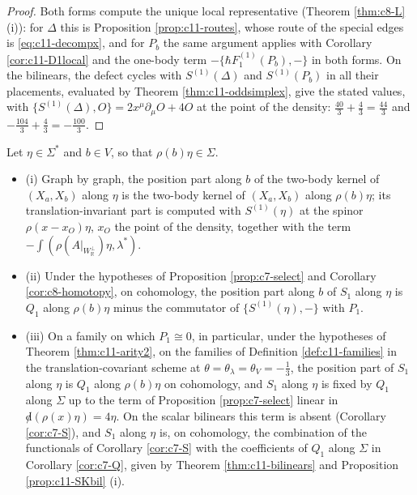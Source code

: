 \begin{proof}
Both forms compute the unique local representative (Theorem \ref{thm:c8-L} (i)): for $\Delta$ this is Proposition \ref{prop:c11-routes}, whose route of the special edges is \eqref{eq:c11-decompx}, and for $P_b$ the same argument applies with Corollary \ref{cor:c11-D1local} and the one-body term $-\{\hbar F_1^{(1)}(P_b),-\}$ in both forms. On the bilinears, the defect cycles with $S^{(1)}(\Delta)$ and $S^{(1)}(P_b)$ in all their placements, evaluated by Theorem \ref{thm:c11-oddsimplex}, give the stated values, with $\{S^{(1)}(\Delta),O\}=2x^\mu\partial_\mu O+4O$ at the point of the density: $\tfrac{40}3+\tfrac43=\tfrac{44}3$ and $-\tfrac{104}3+\tfrac43=-\tfrac{100}3$.
\end{proof}

\begin{proposition}
\label{prop:c11-S}
Let $\eta\in\Sigma^*$ and $b\in V$, so that $\rho(b)\eta\in\Sigma$.
\begin{itemize}
\item (i) Graph by graph, the position part along $b$ of the two-body kernel of $(X_a,X_b)$ along $\eta$ is the two-body kernel of $(X_a,X_b)$ along $\rho(b)\eta$; its translation-invariant part is computed with $S^{(1)}(\eta)$ at the spinor $\rho(x-x_O)\eta$, $x_O$ the point of the density, together with the term $-\int(\rho(A|_{W_{\mathbb R}^\perp})\eta,\lambda^*)$.
\item (ii) Under the hypotheses of Proposition \ref{prop:c7-select} and Corollary \ref{cor:c8-homotopy}, on cohomology, the position part along $b$ of $S_1$ along $\eta$ is $Q_1$ along $\rho(b)\eta$ minus the commutator of $\{S^{(1)}(\eta),-\}$ with $P_1$.
\item (iii) On a family on which $P_1\cong0$, in particular, under the hypotheses of Theorem \ref{thm:c11-arity2}, on the families of Definition \ref{def:c11-families} in the translation-covariant scheme at $\theta=\theta_\lambda=\theta_V=-\tfrac13$, the position part of $S_1$ along $\eta$ is $Q_1$ along $\rho(b)\eta$ on cohomology, and $S_1$ along $\eta$ is fixed by $Q_1$ along $\Sigma$ up to the term of Proposition \ref{prop:c7-select} linear in ${\not d}(\rho(x)\eta)=4\eta$. On the scalar bilinears this term is absent (Corollary \ref{cor:c7-S}), and $S_1$ along $\eta$ is, on cohomology, the combination of the functionals of Corollary \ref{cor:c7-S} with the coefficients of $Q_1$ along $\Sigma$ in Corollary \ref{cor:c7-Q}, given by Theorem \ref{thm:c11-bilinears} and Proposition \ref{prop:c11-SKbil} (i).

\end{itemize}
\end{proposition}
